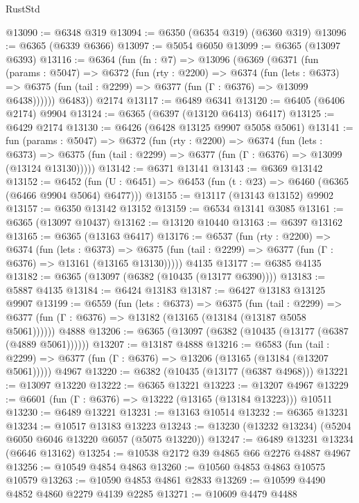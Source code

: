 \begin{lexlean}{RustStd}
\begin{coremodule}
@13090 := @6348 @319
@13094 := @6350 (@6354 @319) (@6360 @319)
@13096 := @6365 (@6339 @6366)
@13097 := @5054 @6050
@13099 := @6365 (@13097 @6393)
@13116 := @6364
    (fun (fn : @7) =>
    @13096
      (@6369
        (@6371
          (fun (params : @5047) =>
          @6372
            (fun (rty : @2200) =>
            @6374
              (fun (lets : @6373) =>
              @6375 (fun (tail : @2299) => @6377 (fun (Γ : @6376) => @13099 @6438))))))
        @6483))
    @2174
@13117 := @6489 @6341
@13120 := @6405 (@6406 @2174) @9904
@13124 := @6365 (@6397 (@13120 @6413) @6417)
@13125 := @6429 @2174
@13130 := @6426 (@6428 @13125 @9907 @5058 @5061)
@13141 := fun (params : @5047) =>
  @6372
    (fun (rty : @2200) =>
    @6374
      (fun (lets : @6373) =>
      @6375 (fun (tail : @2299) => @6377 (fun (Γ : @6376) => @13099 (@13124 @13130)))))
@13142 := @6371 @13141
@13143 := @6369 @13142
@13152 := @6452
    (fun (U : @6451) => @6453 (fun (t : @23) => @6460 (@6365 (@6466 @9904 @5064) @6477)))
@13155 := @13117 (@13143 @13152) @9902
@13157 := @6350 @13142 @13152
@13159 := @6534 @13141 @3085
@13161 := @6365 (@13097 @10437)
@13162 := @13120 @10440
@13163 := @6397 @13162
@13165 := @6365 (@13163 @6417)
@13176 := @6537
    (fun (rty : @2200) =>
    @6374
      (fun (lets : @6373) =>
      @6375 (fun (tail : @2299) => @6377 (fun (Γ : @6376) => @13161 (@13165 @13130)))))
    @4135
@13177 := @6385 @4135
@13182 := @6365 (@13097 (@6382 (@10435 (@13177 @6390))))
@13183 := @5887 @4135
@13184 := @6424 @13183
@13187 := @6427 @13183 @13125 @9907
@13199 := @6559
    (fun (lets : @6373) =>
    @6375
      (fun (tail : @2299) =>
      @6377 (fun (Γ : @6376) => @13182 (@13165 (@13184 (@13187 @5058 @5061))))))
    @4888
@13206 := @6365 (@13097 (@6382 (@10435 (@13177 (@6387 (@4889 @5061))))))
@13207 := @13187 @4888
@13216 := @6583
    (fun (tail : @2299) => @6377 (fun (Γ : @6376) => @13206 (@13165 (@13184 (@13207 @5061)))))
    @4967
@13220 := @6382 (@10435 (@13177 (@6387 @4968)))
@13221 := @13097 @13220
@13222 := @6365 @13221
@13223 := @13207 @4967
@13229 := @6601 (fun (Γ : @6376) => @13222 (@13165 (@13184 @13223))) @10511
@13230 := @6489 @13221
@13231 := @13163 @10514
@13232 := @6365 @13231
@13234 := @10517 @13183 @13223
@13243 := @13230 (@13232 @13234) (@5204 @6050 @6046 @13220 @6057 (@5075 @13220))
@13247 := @6489 @13231 @13234 (@6646 @13162)
@13254 := @10538 @2172 @39 @4865 @66 @2276 @4887 @4967
@13256 := @10549 @4854 @4863
@13260 := @10560 @4853 @4863 @10575 @10579
@13263 := @10590 @4853 @4861 @2833
@13269 := @10599 @4490 @4852 @4860 @2279 @4139 @2285
@13271 := @10609 @4479 @4488

\end{coremodule}
\end{lexlean}
